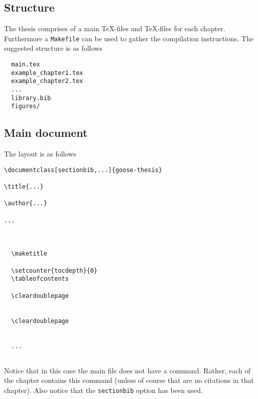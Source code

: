 \subsection{Structure}

The thesis comprises of a main \TeX-files and \TeX-files for each chapter. Furthermore a \texttt{Makefile} can be used to gather the compilation instructions. The suggested structure is as follows
%
\begin{verbatim}
  main.tex
  example_chapter1.tex
  example_chapter2.tex
  ...
  library.bib
  figures/
\end{verbatim}
%

\subsection{Main document}

The layout is as follows
\begin{mdframed}
\begin{verbatim}
\documentclass[sectionbib,...]{goose-thesis}

\title{...}

\author{...}

...



  \maketitle

  \setcounter{tocdepth}{0}
  \tableofcontents

  \cleardoublepage
  

  \cleardoublepage
  

  ...


\end{verbatim}
\end{mdframed}

Notice that in this case the main file does not have a \verb|| command. Rather, each of the chapter contains this command (unless of course that are no citations in that chapter). Also notice that the \verb|sectionbib| option has been used.

